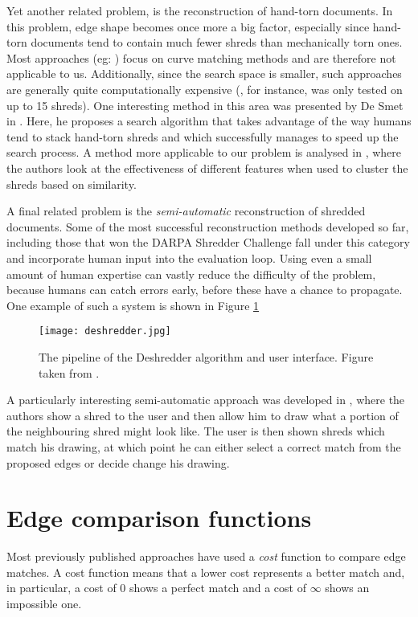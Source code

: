 Yet another related problem, is the reconstruction of hand-torn documents. In this problem, edge shape becomes once more a big factor, especially since hand-torn documents tend to contain much fewer shreds than mechanically torn ones. Most approaches (eg: \cite{P18,P27,P31}) focus on curve matching methods and are therefore not applicable to us. Additionally, since the search space is smaller, such approaches are generally quite computationally expensive (\cite{P18}, for instance, was only tested on up to 15 shreds). One interesting method in this area was presented by De Smet in \cite{P30}. Here, he proposes a search algorithm that takes advantage of the way humans tend to stack hand-torn shreds and which successfully manages to speed up the search process. A method more applicable to our problem is analysed in \cite{P32}, where the authors look at the effectiveness of different features when used to cluster the shreds based on similarity.

A final related problem is the \emph{semi-automatic} reconstruction of shredded documents. Some of the most successful reconstruction methods developed so far, including those that won the DARPA Shredder Challenge \cite{P33,P34} fall under this category and incorporate human input into the evaluation loop. Using even a small amount of human expertise can vastly reduce the difficulty of the problem, because humans can catch errors early, before these have a chance to propagate. One example of such a system is shown in Figure \ref{fig:deshredder}

\begin{figure}[h]
    \centering
    \texttt{[image: deshredder.jpg]}
    \caption{The pipeline of the Deshredder algorithm and user interface. Figure taken from \cite{P34}.}
    \label{fig:deshredder}
\end{figure}

A particularly interesting semi-automatic approach was developed in \cite{P35}, where the authors show a shred to the user and then allow him to draw what a portion of the neighbouring shred might look like. The user is then shown shreds which match his drawing, at which point he can either select a correct match from the proposed edges or decide change his drawing.

\clearpage

\section{Edge comparison functions}
Most previously published approaches have used a \emph{cost} function to compare edge matches. A cost function means that a lower cost represents a better match and, in particular, a cost of $0$ shows a perfect match and a cost of $\infty$ shows an impossible one. 

